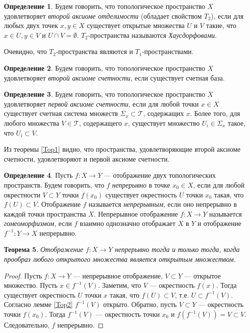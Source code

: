\documentclass[12pt, titlepage, oneside]{amsbook}
\newcommand{\TTT}{{\mathcal T}}
\newtheorem{theorem}{Теорема}[chapter]
\theoremstyle{definition}
\newtheorem{definition}[theorem]{Определение}
\theoremstyle{remark}
\begin{document}
\begin{definition}
	Будем говорить, что топологическое пространство $X$ удовлетворяет \emph{второй аксиоме отделимости} (обладает свойством $T_2$), если для любых двух точек $x,y\in X$ существует открытые множества $U$ и $V$ такие, что $x\in U, y\in V$ и $U\cap V=\emptyset$. $T_2$-пространства называются \emph{Хаусдорфовами}.
\end{definition}

Очевидно, что $T_2$-пространства являются и $T_1$-пространствами.

\begin{definition}
	Будем говорить, что топологическое пространство $X$ удовлетворяет \emph{второй аксиоме счетности}, если существует счетная база.
\end{definition}

\begin{definition}
	Будем говорить, что топологическое пространство $X$ удовлетворяет \emph{первой аксиоме счетности}, если для любой точки $x\in X$ существует счетная система множеств $\Sigma_x\subset\TTT$, содержащих $x$. Более того, для любого множества $V\in\TTT$, содержащего $x$, существует множество $U_i\in\Sigma_x$ такое, что $U_i\subset V$.
\end{definition}

Из теоремы \ref{Top1} видно, что пространства, удовлетворяющие второй аксиоме счетности, удовлетворяют и первой аксиоме счетности.

\begin{definition}
	Пусть $f\colon X\rightarrow Y$ --- отображение двух топологических пространств. Будем говорить, что $f$ \emph{непрерывно} в точке $x_0\in X$, если для любой окрестности $V\subset Y$ точки $f(x_0)$ существует окрестность $U$ точки $x_0$ такая, что $f(U)\subset V$. Отображение $f$ называется \emph{непрерывным}, если оно непрерывно в каждой точки пространства $X$. Непрерывное отображение $f\colon X\rightarrow Y$ называется \emph{гомеоморфизмом}, если $f$ взаимно однозначно отображает $X$ в $Y$ и отображение $f^{-1}\colon Y\rightarrow X$ непрерывно.
\end{definition}

\begin{theorem}
	\label{Top3}
	Отображение $f\colon X\rightarrow Y$ непрерывно тогда и только тогда, когда прообраз любого открытого множества является открытым множеством.
\end{theorem}

\begin{proof}
	Пусть $f\colon X\rightarrow Y$  --- непрерывное отображение, $V\subset Y$ --- открытое множество. Пусть $x\in f^{-1}(V)$. Заметим, что $V$ --- окрестность $f(x)$. Тогда существует окрестность $U$ точки $x$ такая, что $f(U)\subset V$, т.е. $U\subset f^{-1}(V)$. Согласно лемме \ref{Top2} $f^{-1}(V)$ открыто.
	Обратно, пусть $V\subset Y$ --- окрестность точки $f(x_0)$. Тогда $f^{-1}(V)$ --- окрестность точки $x_0$ и $f(f^{-1}(V))=V\subset V$. Следовательно, $f$ непрерывно.
\end{proof}
\end{document}
